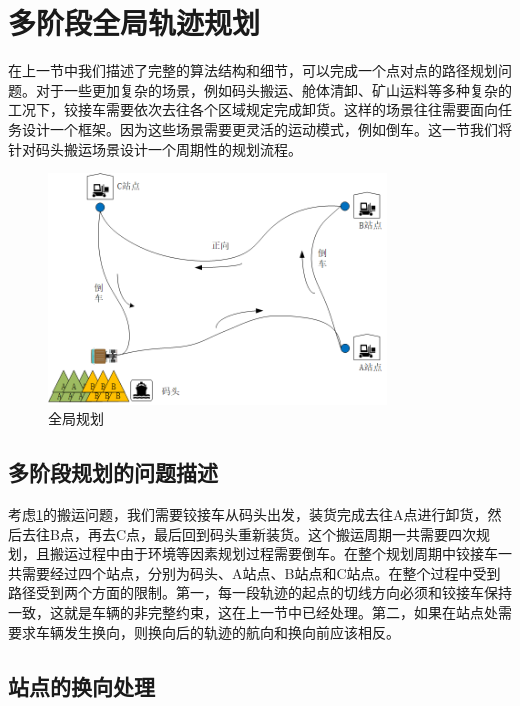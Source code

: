 \documentclass[master,academic]{ysuthesis} %
\begin{document}
	\section{多阶段全局轨迹规划}
	在上一节中我们描述了完整的算法结构和细节，可以完成一个点对点的路径规划问题。对于一些更加复杂的场景，例如码头搬运、舱体清卸、矿山运料等多种复杂的工况下，铰接车需要依次去往各个区域规定完成卸货。这样的场景往往需要面向任务设计一个框架。因为这些场景需要更灵活的运动模式，例如倒车。这一节我们将针对码头搬运场景设计一个周期性的规划流程。
	\begin{figure}[!ht]
		\centering
		\includegraphics[width=0.8\textwidth]{全局规划.png}
		\caption{全局规划}
		\label{fig:全局规划}
	\end{figure}
		\subsection{多阶段规划的问题描述}
		考虑\ref{fig:全局规划}的搬运问题，我们需要铰接车从码头出发，装货完成去往A点进行卸货，然后去往B点，再去C点，最后回到码头重新装货。这个搬运周期一共需要四次规划，且搬运过程中由于环境等因素规划过程需要倒车。在整个规划周期中铰接车一共需要经过四个站点，分别为码头、A站点、B站点和C站点。在整个过程中受到路径受到两个方面的限制。第一，每一段轨迹的起点的切线方向必须和铰接车保持一致，这就是车辆的非完整约束，这在上一节中已经处理。第二，如果在站点处需要求车辆发生换向，则换向后的轨迹的航向和换向前应该相反。 

		\subsection{站点的换向处理}
		
\end{document}
